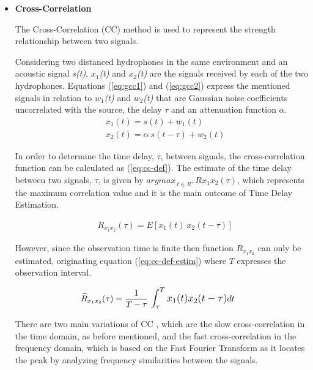 \begin{itemize}
	\item \textbf{Cross-Correlation}

The Cross-Correlation (CC) method  is used to represent the strength relationship between two signals. 

Considering two distanced hydrophones in the same environment and an acoustic signal \textit{s(t)}, \textit{$x_1$(t)} and \textit{$x_2$(t)} are the signals received by each of the two hydrophones. Equations (\ref{eq:gcc1}) and (\ref{eq:gcc2})\cite{crosscorr-76} express the mentioned signals in relation to \textit{$w_1$(t)} and \textit{$w_2$(t)} that are Gaussian noise coefficients uncorrelated with the source, the delay $\tau$ and an attenuation function $\alpha$.
\begin{eqnarray}
	&x_1(t) = s(t) + w_1(t)
	\label{eq:gcc1}\\
	&x_2(t) = \alpha \ s(t - \tau) + w_2(t)
	\label{eq:gcc2}
\end{eqnarray}

In order to determine the time delay, $\tau$, between signals, the cross-correlation function can be calculated as (\ref{eq:cc-def}). The estimate of the time delay between two signals, $\tau$, is given by $arg max_{\ t\in R^+} Rx_1x_2(\tau)$, which represents the maximum correlation value and it is the main outcome of Time Delay Estimation. 

\begin{eqnarray}
&R_{x_1x_2}(\tau) = E[x_1(t) \ x_2(t- \tau)]
\label{eq:cc-def}
\end{eqnarray}

However, since the observation time is finite then function $R_{x_1x_2}$ can only be estimated, originating equation (\ref{eq:cc-def-estim}) where $T$ expresses the observation interval.

\begin{eqnarray}
&\widehat R_{x_1x_2}(\tau) = \frac{1}{T - \tau} \ \mathlarger{\int_{\tau}^{T} x_1(t)x_2(t - \tau)} dt
\label{eq:cc-def-estim}
\end{eqnarray}
	
There are two main variations of CC \cite{crosscorr}, which are the slow cross-correlation in the  time domain, as before mentioned, and the fast cross-correlation in the frequency domain, which is based on the Fast Fourier Transform as it locates the peak by analyzing frequency similarities between the signals. 
	

\end{itemize}
